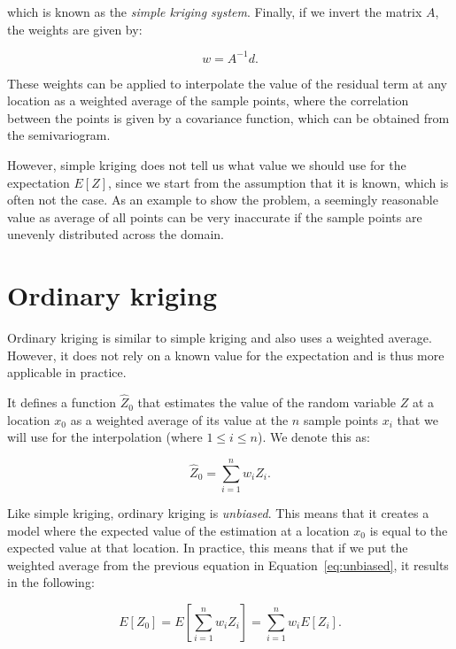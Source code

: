 which is known as the \emph{simple kriging system}.
Finally, if we invert the matrix \(A\), the weights are given by:

\begin{equation}
w = A^{-1}d.
\end{equation}

These weights can be applied to interpolate the value of the residual term at any location as a weighted average of the sample points, where the correlation between the points is given by a covariance function, which can be obtained from the semivariogram.

However, simple kriging does not tell us what value we should use for the expectation \(E[Z]\), since we start from the assumption that it is known, which is often not the case.
As an example to show the problem, a seemingly reasonable value as average of all points can be very inaccurate if the sample points are unevenly distributed across the domain.

\section{Ordinary kriging}%

Ordinary kriging is similar to simple kriging and also uses a weighted average.
However, it does not rely on a known value for the expectation and is thus more applicable in practice.

It defines a function \(\hat{Z}_0\) that estimates the value of the random variable \(Z\) at a location \(x_0\) as a weighted average of its value at the \(n\) sample points \(x_i\) that we will use for the interpolation (where \(1 \leq i \leq n\)).
We denote this as:

\begin{equation}
\label{eq:waok}
\hat{Z}_0 = \sum_{i=1}^n w_i Z_i.
\end{equation}

Like simple kriging, ordinary kriging is \emph{unbiased}.
This means that it creates a model where the expected value of the estimation at a location \(x_0\) is equal to the expected value at that location.
In practice, this means that if we put the weighted average from the previous equation in Equation~\ref{eq:unbiased}, it results in the following:

\begin{equation}
E\left[ Z_0 \right] = E\left[ \sum_{i=1}^n w_i Z_i\right] = \sum_{i=1}^n w_i E\left[Z_i\right].
\end{equation}

